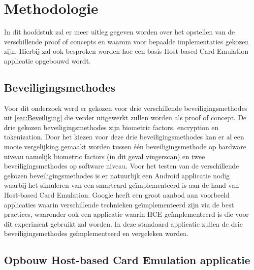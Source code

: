 
\chapter{Methodologie}
\label{ch:methodologie}


In dit hoofdstuk zal er meer uitleg gegeven worden over het opstellen van de verschillende proof of concepts en waarom voor bepaalde implementaties gekozen zijn. Hierbij zal ook besproken worden hoe een basis Host-based Card Emulation applicatie opgebouwd wordt.

\section{Beveiligingsmethodes}

Voor dit onderzoek werd er gekozen voor drie verschillende beveiligingsmethodes uit \ref{sec:Beveiliging} die verder uitgewerkt zullen worden als proof of concept. De drie gekozen beveiligingsmethodes zijn biometric factors, encryption en tokenization. Door het kiezen voor deze drie beveiligingsmethodes kan er al een mooie vergelijking gemaakt worden tussen één beveiligingsmethode op hardware niveau namelijk biometric factors (in dit geval vingerscan) en twee beveiligingsmethodes op software niveau. Voor het testen van de verschillende gekozen beveiligingsmethodes is er natuurlijk een Android applicatie nodig waarbij het simuleren van een smartcard geïmplementeerd is aan de hand van Host-based Card Emulation. Google heeft een groot aanbod aan voorbeeld applicaties waarin verschillende technieken geïmplementeerd zijn via de best practices, waaronder ook een applicatie waarin HCE geïmplementeerd is die voor dit experiment gebruikt zal worden. In deze standaard applicatie zullen de drie beveiligingsmethodes geïmplementeerd en vergeleken worden. 


\section{Opbouw Host-based Card Emulation applicatie}
 
